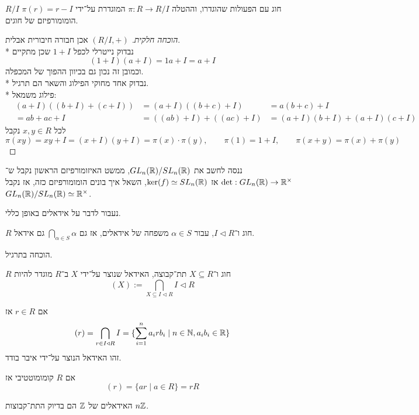 \begin{proposition}
	$R/I$ חוג עם הפעולות שהוגדרו, וההטלה $\pi : R \to R / I$ המוגדרת על־ידי $\pi(r) = r - I$ הומומורפיזם של חוגים.
\end{proposition}
\begin{proof}[הוכחה חלקית]
	$(R/I, +)$ אכן חבורה חיבורית אבלית. \\*
	נבדוק נייטרלי לכפל $1 + I$ שכן מתקיים
	\[
		(1 + I)(a + I) = 1a + I = a + I
	\]
	וכמובן זה נכון גם בכיוון ההפוך של המכפלה. \\*
	נבדוק אחד מחוקי הפילוג והשאר הם תרגיל. \\*
	פילוג משמאל:
	\begin{align*}
		& (a + I)((b + I) + (c + I))
		& = (a + I)((b + c) + I)
		& = a(b + c) + I \\
		& = ab + ac + I
		& = ((ab) + I) + ((ac) + I)
		& = (a + I)(b + I) + (a + I)(c + I)
	\end{align*}
	לכל $x, y \in R$ נקבל
	\[
		\pi(xy) = xy + I = (x + I)(y + I) = \pi(x) \cdot \pi(y),
		\qquad
		\pi(1) = 1 + I,
		\qquad
		\pi(x + y) = \pi(x) + \pi(y)
	\]
\end{proof}
\begin{example}
	ננסה לחשב את $GL_n(\mathbb{R}) / SL_n(\mathbb{R})$, ממשט האיזומורפיזם הראשון נקבל ש־$\det : GL_n(\mathbb{R}) \to \mathbb{R}^\times$ אז $\ker(f) \simeq SL_n(\mathbb{R})$, השאל איך בונים הומומורפיזם כזה, אז נקבל $GL_n(\mathbb{R}) / SL_n(\mathbb{R}) \simeq \mathbb{R}^\times$.
\end{example}
נעבור לדבר על אידאלים באופן כללי.
\begin{lemma}
	$R$ חוג ו־$I \triangleleft R$, עבור $\alpha \in S$ משפחה של אידאלים, אז גם $\bigcap_{\alpha \in S} \alpha$ גם אידאל.
\end{lemma}
הוכחה בתרגיל.
\begin{definition}
	$R$ חוג ו־$X \subseteq R$ תת־קבוצה, האידאל שנוצר על־ידי $X$ ב־$R$ מוגדר להיות
	\[
		(X) := \bigcap_{X \subseteq I \triangleleft R} I \triangleleft R
	\]
\end{definition}
\begin{example}
	אם $r \in R$ אז
	\[
		(r) = \bigcap_{r \in I \triangleleft R} I
		= \{ \sum_{i = 1}^{n} a_i r b_i \mid n \in \mathbb{N}, a_i b_i \in \mathbb{R} \}
	\]
	זהו האידאל הנוצר על־ידי איבר בודד.
\end{example}
\begin{remark}
	אם $R$ קומומוטטיבי אז
	\[
		(r) = \{ a r \mid a \in R \} = rR
	\]
\end{remark}
\begin{proposition}
	האידאלים של $\mathbb{Z}$ הם בדיוק התת־קבוצות $n \mathbb{Z}$.
\end{proposition}
